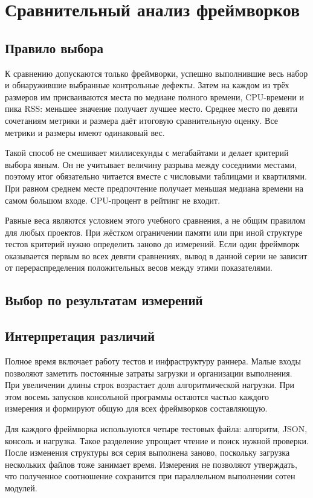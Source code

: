 \chapter{Сравнительный анализ фреймворков}\label{ch4}
\section{Правило выбора}
К сравнению допускаются только фреймворки, успешно выполнившие весь набор и обнаружившие выбранные контрольные дефекты. Затем на каждом из трёх размеров им присваиваются места по медиане полного времени, CPU-времени и пика RSS: меньшее значение получает лучшее место. Среднее место по девяти сочетаниям метрики и размера даёт итоговую сравнительную оценку. Все метрики и размеры имеют одинаковый вес.

Такой способ не смешивает миллисекунды с мегабайтами и делает критерий выбора явным. Он не учитывает величину разрыва между соседними местами, поэтому итог обязательно читается вместе с числовыми таблицами и квартилями. При равном среднем месте предпочтение получает меньшая медиана времени на самом большом входе. CPU-процент в рейтинг не входит.

Равные веса являются условием этого учебного сравнения, а не общим правилом для любых проектов. При жёстком ограничении памяти или при иной структуре тестов критерий нужно определить заново до измерений. Если один фреймворк оказывается первым во всех девяти сравнениях, вывод в данной серии не зависит от перераспределения положительных весов между этими показателями.

\section{Выбор по результатам измерений}



\section{Интерпретация различий}
Полное время включает работу тестов и инфраструктуру раннера. Малые входы позволяют заметить постоянные затраты загрузки и организации выполнения. При увеличении длины строк возрастает доля алгоритмической нагрузки. При этом восемь запусков консольной программы остаются частью каждого измерения и формируют общую для всех фреймворков составляющую.

Для каждого фреймворка используются четыре тестовых файла: алгоритм, JSON, консоль и нагрузка. Такое разделение упрощает чтение и поиск нужной проверки. После изменения структуры вся серия выполнена заново, поскольку загрузка нескольких файлов тоже занимает время. Измерения не позволяют утверждать, что полученное соотношение сохранится при параллельном выполнении сотен модулей.

